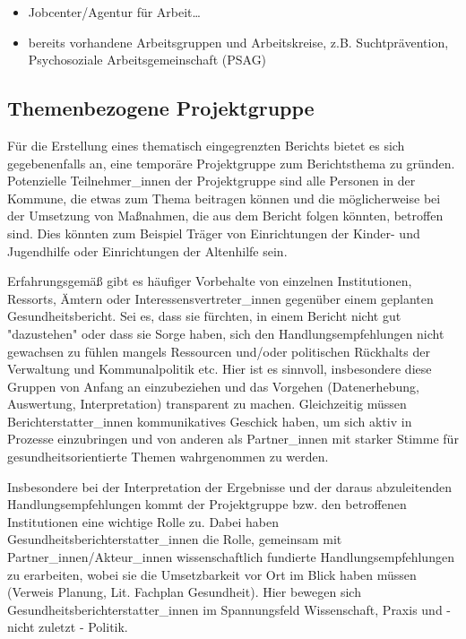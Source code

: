 \documentclass{article}
\begin{document}
\begin{itemize}
\item Jobcenter/Agentur für Arbeit…


\item bereits vorhandene Arbeitsgruppen und Arbeitskreise, z.B. Suchtprävention, Psychosoziale Arbeitsgemeinschaft (PSAG)


\end{itemize}

\subsection{Themenbezogene Projektgruppe}\label{H1702121}



Für die Erstellung eines thematisch eingegrenzten Berichts bietet es sich gegebenenfalls an, eine temporäre Projektgruppe zum Berichtsthema zu gründen. Potenzielle Teilnehmer\_innen der Projektgruppe sind alle Personen in der Kommune, die etwas zum Thema beitragen können und die möglicherweise bei der Umsetzung von Maßnahmen, die aus dem Bericht folgen könnten, betroffen sind. Dies könnten zum Beispiel Träger von Einrichtungen der Kinder- und Jugendhilfe oder Einrichtungen der Altenhilfe sein.


Erfahrungsgemäß gibt es häufiger Vorbehalte von einzelnen Institutionen, Ressorts, Ämtern oder Interessensvertreter\_innen gegenüber einem geplanten Gesundheitsbericht. Sei es, dass sie fürchten, in einem Bericht nicht gut "dazustehen" oder dass sie Sorge haben, sich den Handlungsempfehlungen nicht gewachsen zu fühlen mangels Ressourcen und/oder politischen Rückhalts der Verwaltung und Kommunalpolitik etc. Hier ist es sinnvoll, insbesondere diese Gruppen von Anfang an einzubeziehen und das Vorgehen (Datenerhebung, Auswertung, Interpretation) transparent zu machen. Gleichzeitig müssen Berichterstatter\_innen kommunikatives Geschick haben, um sich aktiv in Prozesse einzubringen und von anderen als Partner\_innen mit starker Stimme für gesundheitsorientierte Themen wahrgenommen zu werden.


Insbesondere bei der Interpretation der Ergebnisse und der daraus abzuleitenden Handlungsempfehlungen kommt der Projektgruppe bzw. den betroffenen Institutionen eine wichtige Rolle zu. Dabei haben Gesundheitsberichterstatter\_innen die Rolle, gemeinsam mit Partner\_innen/Akteur\_innen wissenschaftlich fundierte Handlungsempfehlungen zu erarbeiten, wobei sie die Umsetzbarkeit vor Ort im Blick haben müssen (Verweis Planung, Lit. Fachplan Gesundheit). Hier bewegen sich Gesundheitsberichterstatter\_innen im Spannungsfeld Wissenschaft, Praxis und - nicht zuletzt - Politik.
\end{document}
